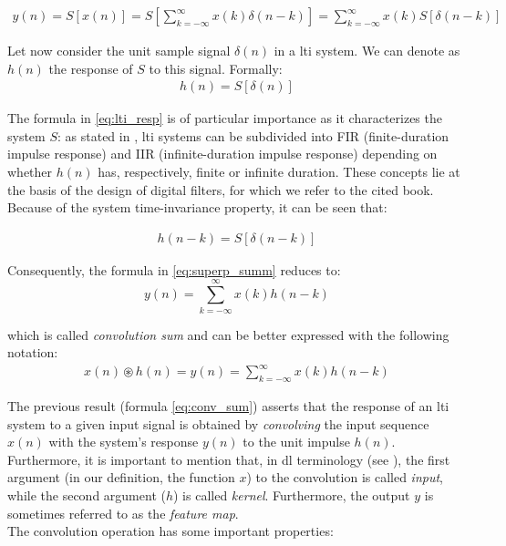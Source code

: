 \begin{align} \label{eq:superp_summ}
	y(n) = S[x(n)] = S\left[\sum_{k = - \infty}^{\infty}x(k)\delta(n-k)\right] =  \sum_{k = - \infty}^{\infty}x(k)S\left[\delta(n-k)\right]
\end{align}

\noindent Let now consider the unit sample signal $\delta(n)$ in a \gls{lti} system. We can denote as $h(n)$ the response of $S$ to this signal. Formally:
\begin{align} \label{eq:lti_resp}
	h(n) = S[\delta(n)]
\end{align}

\noindent The formula in \ref{eq:lti_resp} is of particular importance as it characterizes the system $S$: as stated in \cite{proakis2006dimitris}, \gls{lti} systems can be subdivided into FIR (finite-duration impulse response) and IIR (infinite-duration impulse response) depending on whether $h(n)$ has, respectively, finite or infinite duration. These concepts lie at the basis of the design of digital filters, for which we refer to the cited book.\\
Because of the system time-invariance property, it can be seen that:

\begin{align}
	h(n-k) = S[\delta(n-k)]
\end{align}

\noindent Consequently, the formula in \ref{eq:superp_summ} reduces to:
$$
	y(n) = \sum_{k = - \infty}^{\infty}x(k)h(n-k)
$$

\noindent which is called \textit{convolution sum} and can be better expressed with the following notation: 
\begin{align} \label{eq:conv_sum}
x(n) \circledast h(n) = y(n) = \sum_{k = - \infty}^{\infty}x(k)h(n-k)
\end{align}

\noindent The previous result (formula \ref{eq:conv_sum}) asserts that the response of an \gls{lti} system to a given input signal is obtained by \textit{convolving} the input sequence $x(n)$ with the system's response $y(n)$ to the unit impulse $h(n)$. \\
Furthermore, it is important to mention that, in \gls{dl} terminology (see \cite{goodfellow2016deep}), the first argument (in our definition, the function $x$) to the convolution is called \textit{input}, while the second argument ($h$) is called \textit{kernel}. Furthermore, the output $y$ is sometimes referred to as the \textit{feature map}. \\
The convolution operation has some important properties:

